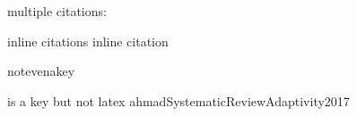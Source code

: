 multiple citations:

\cite{abdaiMethodologicalChallengesUse2018, abecasisHIV1SubtypeDistribution2013}

\cite{ahmadSystematicReviewAdaptivity2017}

inline citations \cite{ahmadSystematicReviewAdaptivity2017} inline citation

\cite{missingkey} 

notevenakey

is a key but not latex ahmadSystematicReviewAdaptivity2017 
